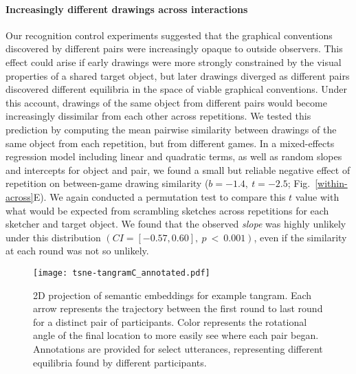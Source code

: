 \paragraph{Increasingly different drawings across interactions}
Our recognition control experiments suggested that the graphical conventions discovered by different pairs were increasingly opaque to outside observers.
This effect could arise if early drawings were more strongly constrained by the visual properties of a shared target object, but later drawings diverged as different pairs discovered different equilibria in the space of viable graphical conventions.
Under this account, drawings of the same object from different pairs would become increasingly dissimilar from each other across repetitions.
We tested this prediction by computing the mean pairwise similarity between drawings of the same object from each repetition, but from different games.
In a mixed-effects regression model including linear and quadratic terms, as well as random slopes and intercepts for object and pair, we found a small but reliable negative effect of repetition on between-game drawing similarity ($b = -1.4, ~t = -2.5$; Fig.~\ref{within-across}E). %
We again conducted a permutation test to compare this $t$ value with what would be expected from scrambling sketches across repetitions for each sketcher and target object.
We found that the observed \emph{slope} was highly unlikely under this distribution $(CI = [-0.57, 0.60],~p~<~0.001)$, even if the similarity at each round was not so unlikely.


\begin{figure}[t!]
\centering
\texttt{[image: tsne-tangramC\_annotated.pdf]}
\caption{2D projection of semantic embeddings for example tangram. Each arrow represents the trajectory between the first round to last round for a distinct pair of participants. Color represents the rotational angle of the final location to more easily see where each pair began. Annotations are provided for select utterances, representing different equilibria found by different participants.}
\label{fig:tsne}
\end{figure}



